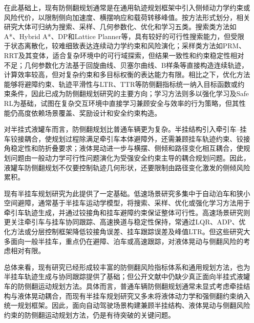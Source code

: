       在此基础上，现有防侧翻规划通常是在通用轨迹规划框架中引入侧倾动力学约束或风险代价，以限制侧向加速度、横摆响应和载荷转移峰值。按方法形式划分，相关研究大体可归纳为搜索、采样、几何参数化、优化和学习五类。搜索类方法如A*、Hybrid A*、DP和Lattice Planner等\cite{likhachev2009planning,kurzer2016hybrida,dong2023ecocruising,werling2010frenet}，具有较好的可行性搜索能力，但受限于状态离散化，较难细致表达连续动力学约束和风险演化；采样类方法如PRM、RRT及其变体\cite{kuwata2009realtime,karaman2011sampling,klemm2015rrtconnect,fan2024birrt}，适合复杂环境中的可行域探索，但结果一致性和约束稳定性相对不足；几何参数化方法基于回旋曲线、贝塞尔曲线、B样条等直接构造连续轨迹\cite{brezak2014clothoids,rastelli2014continuouscurvature,phanhuu2021bsplines,gotte2018splinebased,hegedus2020realtime}，计算效率较高，但对复杂约束和多目标权衡的表达能力有限。相比之下，优化方法能够将避障约束、轨迹平滑性与LTR、TTR等防侧翻指标统一纳入目标函数或约束条件，因此已成为防侧翻规划研究的主要方向\cite{rasekhipour2017pfmpc,jin2021heavytruck,cheng2019longitudinal,li2019rollover,dong2023ecocruising}；学习方法则多以强化学习及Safe RL为基础，试图在复杂交互环境中直接学习兼顾安全与效率的行为策略\cite{wu2024rlsurvey,zhang2023intersectionrl,irshayyid2024highwayrl,zhang2024saferl_tits,gu2024saferl_tpami,garcia2015saferl}，但其性能仍高度依赖场景覆盖、奖励设计和安全约束构造。

      对半挂式液罐车而言，防侧翻规划比普通车辆更为复杂。半挂结构引入牵引车--挂车铰接耦合，使规划过程除满足牵引车本体避障外，还需兼顾挂车轨迹约束、铰接角稳定性和防折叠要求\cite{zongchangfu2014identification,niezhigen2015heavyduty}；液体晃动进一步与横摆、侧倾和路径变化相互耦合，使规划问题由一般动力学可行性问题演化为受强安全约束主导的耦合规划问题。因此，液罐车防侧翻规划不仅要控制轨迹几何形状，还要限制由路径变化激发的侧倾风险累积。

      现有半挂车规划研究为此提供了一定基础。低速场景研究多集中于自动泊车和狭小空间避障，通常基于半挂车运动学模型，将搜索、采样、优化或强化学习方法用于牵引车轨迹生成，并通过铰接角和挂车避障约束保证整体可行性\cite{wangyuanmin2024,chenchao2023,jiasenchao2023}。高速场景研究则更关注牵引车与挂车协同跟踪、高速换道与稳定性保持，常通过LQR、ADP、优化方法或分层控制框架降低铰接角误差、挂车跟踪误差及峰值LTR\cite{lisixu2021,caoliling2024,zhangfawang2025,songguanghao2023,wanghongchang2023}。但这些研究大多面向一般半挂车，重点仍在避障、泊车或高速跟踪，对液体晃动与侧翻风险的考虑相对有限。

      总体来看，现有研究已经形成较丰富的防侧翻风险指标体系和通用规划方法，也为半挂车轨迹生成与协同跟踪提供了基础；但公开文献中仍缺少真正面向半挂式液罐车的防侧翻运动规划方法。具体而言，普通车辆防侧翻规划通常未显式考虑牵挂结构与液体晃动耦合，而现有半挂车规划研究又多未将液体动力学和强侧翻约束纳入统一规划框架。因此，面向自动驾驶场景构建兼顾半挂结构、液体晃动与侧翻风险约束的防侧翻运动规划方法，仍是有待突破的关键问题。

